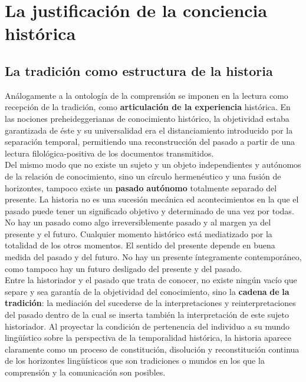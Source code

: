 \documentclass[a4paper, 11pt, twocolumn, spanish]{article}
\begin{document}
\section{La justificación de la conciencia histórica}
\label{sec:orgc287b44}

\subsection{La tradición como estructura de la historia}
\label{sec:org6b29d2d}
Análogamente a la ontología de la comprensión se imponen en la lectura
como recepción de la tradición, como \textbf{articulación de la experiencia}
histórica. En las nociones preheideggerianas de conocimiento
histórico, la objetividad estaba garantizada de éste y su
universalidad era el distanciamiento introducido por la separación
temporal, permitiendo una reconstrucción del pasado a partir de una
lectura filológica-positiva de los documentos transmitidos.\\[0pt]

Del mismo modo que no existe un sujeto y un objeto independientes y
autónomos de la relación de conocimiento, sino un círculo hermenéutico
y una fusión de horizontes, tampoco existe un \textbf{pasado} \textbf{autónomo}
totalmente separado del presente. La historia no es una sucesión
mecánica ed acontecimientos en la que el pasado puede tener un
significado objetivo y determinado de una vez por todas. No hay un
pasado como algo irreversiblemente pasado y al margen ya del presente
y el futuro. Cualquier momento histórico está mediatizado por la
totalidad de los otros momentos. El sentido del presente depende en
buena medida del pasado y del futuro. No hay un presente íntegramente
contemporáneo, como tampoco hay un futuro desligado del presente y del
pasado.\\[0pt]

Entre la historiador y el pasado que trata de conocer, no existe
ningún vacío que separe y sea garantía de la objetividad del
conocimiento, sino la \textbf{cadena} \textbf{de} \textbf{la} \textbf{tradición}: la mediación del
sucederse de la interpretaciones y reinterpretaciones del pasado
dentro de la cual se inserta también la interpretación de este sujeto
historiador. Al proyectar la condición de pertenencia del individuo a
su mundo lingüístico sobre la perspectiva de la temporalidad
histórica, la historia aparece claramente como un proceso de
constitución, disolución y reconstitución continua de los horizontes
lingüísticos que son tradiciones o mundos en los que la comprensión y
la comunicación son posibles.\\[0pt]
\end{document}
